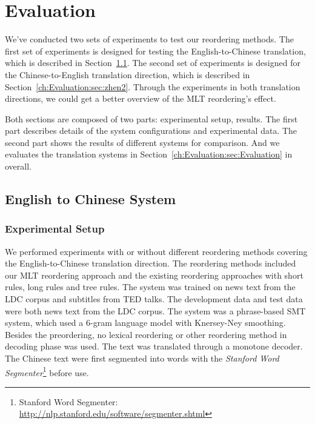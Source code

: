 
\chapter{Evaluation}
\label{ch:Evaluation}

We've conducted two sets of experiments to test our reordering methods. The first set of experiments is designed for testing the English-to-Chinese translation, which is described in Section~\ref{ch:Evaluation:sec:enw}. The second set of experiments is designed for the Chinese-to-English translation direction, which is described in Section~\ref{ch:Evaluation:sec:zhen2}. Through the experiments in both translation directions, we could get a better overview of the \ac{MLT} reordering's effect.

Both sections are composed of two parts: experimental setup, results. The first part describes details of the system configurations and experimental data. The second part shows the results of different systems for comparison. And we evaluates the translation systems in Section~\ref{ch:Evaluation:sec:Evaluation} in overall.


\section{English to Chinese System}
\label{ch:Evaluation:sec:enw}

\subsection{Experimental Setup}
We performed experiments with or without different reordering methods covering the English-to-Chinese translation direction. The reordering methods included our \ac{MLT} reordering approach and the existing reordering approaches with short rules, long rules and tree rules. The system was trained on news text from the \acs{LDC} corpus and subtitles from \acs{TED} talks. The development data and test data were both news text from the \acs{LDC} corpus. The system was a phrase-based \ac{SMT} system, which used a $6$-gram language model with Knersey-Ney smoothing. Besides the preordering, no lexical reordering or other reordering method in decoding phase was used. The text was translated through a monotone decoder. The Chinese text were first segmented into words with the \emph{Stanford Word Segmenter}\footnote{Stanford Word Segmenter: \url{http://nlp.stanford.edu/software/segmenter.shtml}} before use.

